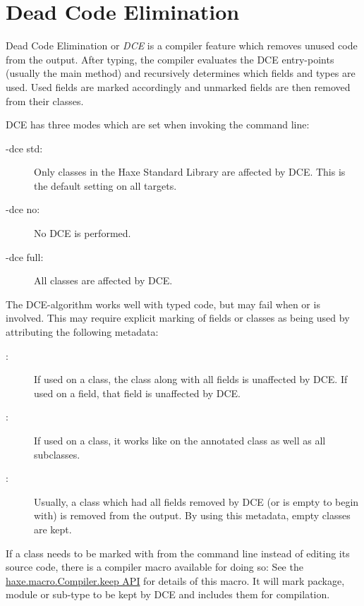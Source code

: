 \section{Dead Code Elimination}
\label{cr-dce}

Dead Code Elimination or \emph{DCE} is a compiler feature which removes unused code from the output. After typing, the compiler evaluates the DCE entry-points (usually the main method) and recursively determines which fields and types are used. Used fields are marked accordingly and unmarked fields are then removed from their classes.

DCE has three modes which are set when invoking the command line:

\begin{description}
	\item[-dce std:] Only classes in the Haxe Standard Library are affected by DCE. This is the default setting on all targets.
	\item[-dce no:] No DCE is performed.
	\item[-dce full:] All classes are affected by DCE.
\end{description}
The DCE-algorithm works well with typed code, but may fail when  or  is involved. This may require explicit marking of fields or classes as being used by attributing the following metadata:

\begin{description}
	\item[:] If used on a class, the class along with all fields is unaffected by DCE. If used on a field, that field is unaffected by DCE.
	\item[:] If used on a class, it works like  on the annotated class as well as all subclasses.
	\item[:] Usually, a class which had all fields removed by DCE (or is empty to begin with) is removed from the output. By using this metadata, empty classes are kept.
\end{description}

If a class needs to be marked with  from the command line instead of editing its source code, there is a compiler macro available for doing so:  See the \href{http://api.haxe.org/haxe/macro/Compiler.html#keep}{haxe.macro.Compiler.keep API} for details of this macro. It will mark package, module or sub-type to be kept by DCE and includes them for compilation.
 

